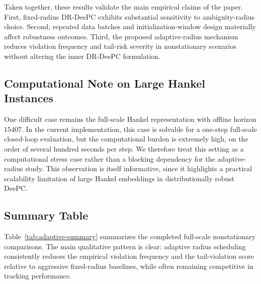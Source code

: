 \documentclass[conference]{IEEEtran}
\begin{document}
Taken together, these results validate the main empirical claims of the paper. First, fixed-radius DR-DeePC exhibits substantial sensitivity to ambiguity-radius choice. Second, repeated data batches and initialization-window design materially affect robustness outcomes. Third, the proposed adaptive-radius mechanism reduces violation frequency and tail-risk severity in nonstationary scenarios without altering the inner DR-DeePC formulation.

\subsection{Computational Note on Large Hankel Instances}
One difficult case remains the full-scale Hankel representation with offline horizon $15407$. In the current implementation, this case is solvable for a one-step full-scale closed-loop evaluation, but the computational burden is extremely high, on the order of several hundred seconds per step. We therefore treat this setting as a computational stress case rather than a blocking dependency for the adaptive-radius study. This observation is itself informative, since it highlights a practical scalability limitation of large Hankel embeddings in distributionally robust DeePC.

\subsection{Summary Table}
Table~\ref{tab:adaptive-summary} summarizes the completed full-scale nonstationary comparisons. The main qualitative pattern is clear: adaptive radius scheduling consistently reduces the empirical violation frequency and the tail-violation score relative to aggressive fixed-radius baselines, while often remaining competitive in tracking performance.
\end{document}
